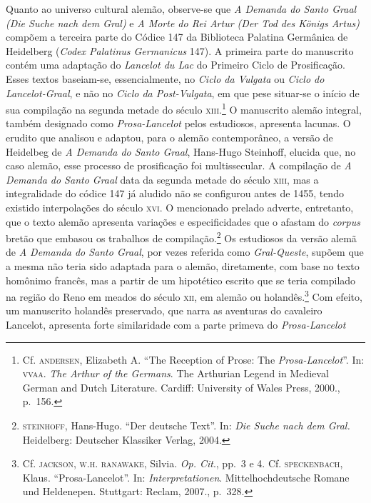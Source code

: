 Quanto ao universo cultural alemão, observe-se que  \textit{A Demanda do
Santo Graal} \textit{(Die Suche nach dem Gral)} e \textit{A Morte do
Rei Artur (Der Tod des Königs Artus)} compõem a terceira parte do
Códice 147 da Biblioteca Palatina Germânica de Heidelberg
(\textit{Codex Palatinus Germanicus} 147). A primeira parte do
manuscrito contém uma adaptação do \textit{Lancelot du Lac} do Primeiro
Ciclo de Prosificação. Esses textos baseiam-se, essencialmente, no
\textit{Ciclo da Vulgata} ou \textit{Ciclo do Lancelot-Graal}, e não no
\textit{Ciclo da Post-Vulgata}, em que pese situar-se o início de sua
compilação na segunda metade do século \textsc{xiii}.\footnote{ Cf. \textsc{andersen},
Elizabeth A. “The Reception of Prose: The \textit{Prosa-Lancelot}”. In:
\textsc{vvaa}. \textit{The Arthur of the Germans}. The Arthurian Legend in
Medieval German and Dutch Literature. Cardiff: University of Wales
Press, 2000., p.~156.} O manuscrito alemão integral, também designado
como \textit{Prosa-Lancelot} pelos estudiosos, apresenta lacunas. O
erudito que analisou e adaptou, para o alemão contemporâneo, a versão
de Heidelbeg de\textit{ A Demanda do Santo Graal}, Hans-Hugo Steinhoff,
elucida que, no caso alemão, esse processo de prosificação foi
multissecular. A compilação de \textit{A Demanda do Santo Graal} data
da segunda metade do século \textsc{xiii}, mas a integralidade do códice 147 já
aludido não se configurou antes de 1455, tendo existido interpolações
do século \textsc{xvi}. O mencionado prelado adverte, entretanto, que o texto
alemão apresenta variações e especificidades que o afastam do
\textit{corpus} bretão que embasou os trabalhos de compilação.\footnote{
\textsc{steinhoff}, Hans-Hugo. “Der deutsche Text”. In: \textit{Die Suche nach
dem Gral.} Heidelberg: Deutscher Klassiker Verlag, 2004.} Os
estudiosos da versão alemã de \textit{A Demanda do Santo Graal}, por
vezes referida como \textit{Gral-Queste}, supõem que a mesma não teria
sido adaptada para o alemão, diretamente, com base no texto homônimo
francês, mas a partir de um hipotético escrito que se teria compilado
na região do Reno em meados do século \textsc{xii}, em alemão ou
holandês.\footnote{ Cf. \textsc{jackson}, \textsc{w.h. ranawake}, Silvia. \textit{Op.
Cit}., pp.~3 e 4. Cf. \textsc{speckenbach}, Klaus. “Prosa-Lancelot”. In:
\textit{Interpretationen}. Mittelhochdeutsche Romane und Heldenepen.
Stuttgart: Reclam, 2007., p.~328.} Com efeito, um manuscrito holandês
preservado, que narra as aventuras do cavaleiro Lancelot, apresenta
forte similaridade com a parte primeva do \textit{Prosa-Lancelot}
